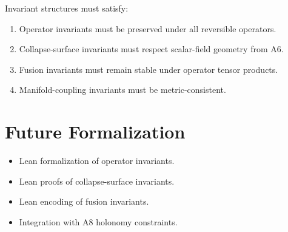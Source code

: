 \documentclass[12pt]{article}
\begin{document}
\begin{definition}
Invariant structures must satisfy:
\begin{enumerate}
    \item Operator invariants must be preserved under all reversible operators.
    \item Collapse-surface invariants must respect scalar-field geometry from A6.
    \item Fusion invariants must remain stable under operator tensor products.
    \item Manifold-coupling invariants must be metric-consistent.
\end{enumerate}
\end{definition}

\section{Future Formalization}

\begin{itemize}
    \item Lean formalization of operator invariants.
    \item Lean proofs of collapse-surface invariants.
    \item Lean encoding of fusion invariants.
    \item Integration with A8 holonomy constraints.
\end{itemize}
\end{document}
